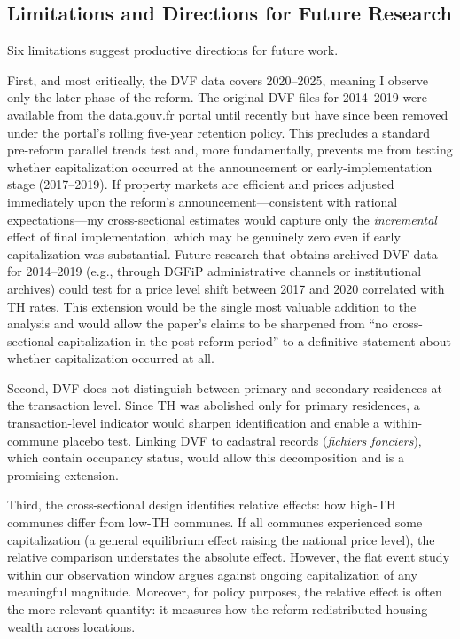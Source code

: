 \documentclass[12pt]{article}
\begin{document}
\subsection{Limitations and Directions for Future Research}

Six limitations suggest productive directions for future work.

First, and most critically, the DVF data covers 2020--2025, meaning I observe only the later phase of the reform. The original DVF files for 2014--2019 were available from the data.gouv.fr portal until recently but have since been removed under the portal's rolling five-year retention policy. This precludes a standard pre-reform parallel trends test and, more fundamentally, prevents me from testing whether capitalization occurred at the announcement or early-implementation stage (2017--2019). If property markets are efficient and prices adjusted immediately upon the reform's announcement---consistent with rational expectations---my cross-sectional estimates would capture only the \emph{incremental} effect of final implementation, which may be genuinely zero even if early capitalization was substantial. Future research that obtains archived DVF data for 2014--2019 (e.g., through DGFiP administrative channels or institutional archives) could test for a price level shift between 2017 and 2020 correlated with TH rates. This extension would be the single most valuable addition to the analysis and would allow the paper's claims to be sharpened from ``no cross-sectional capitalization in the post-reform period'' to a definitive statement about whether capitalization occurred at all.

Second, DVF does not distinguish between primary and secondary residences at the transaction level. Since TH was abolished only for primary residences, a transaction-level indicator would sharpen identification and enable a within-commune placebo test. Linking DVF to cadastral records (\emph{fichiers fonciers}), which contain occupancy status, would allow this decomposition and is a promising extension.

Third, the cross-sectional design identifies relative effects: how high-TH communes differ from low-TH communes. If all communes experienced some capitalization (a general equilibrium effect raising the national price level), the relative comparison understates the absolute effect. However, the flat event study within our observation window argues against ongoing capitalization of any meaningful magnitude. Moreover, for policy purposes, the relative effect is often the more relevant quantity: it measures how the reform redistributed housing wealth across locations.
\end{document}
